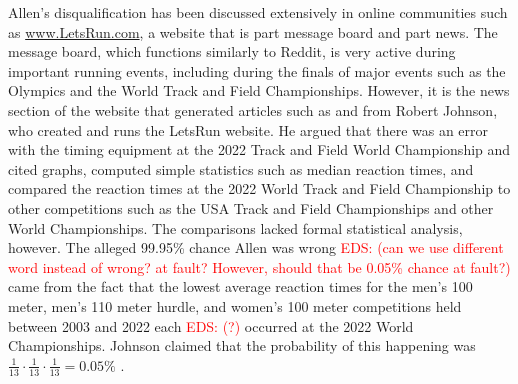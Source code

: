 \documentclass[12pt, letterpaper, titlepage]{article}
\newcommand{\eds}[1]{\textcolor{red}{EDS: (#1)}}
\newcommand{\of}[1]{\textcolor{violet}{OF: #1}}
\begin{document}

Allen's disqualification has been discussed extensively in online communities
such as \url{www.LetsRun.com}, a website that is part message board and part
news. The message board,
which functions similarly to Reddit, is very active during important running
events, including during the finals of major events such as
the Olympics and the World Track and Field Championships.  However, it is the
news section of the website that generated articles such as \citet{johnson2022data}
and \citet{johnson2022was} from  Robert Johnson, who created and runs 
the LetsRun website.  He argued that there was an error
with the timing equipment at the 2022 Track and Field World Championship and
cited graphs, computed simple statistics such as median reaction times, and 
compared the reaction times at the 2022 World Track and Field Championship to 
other competitions
such as the USA Track and Field Championships and other World Championships.
The comparisons lacked formal statistical analysis, however. 
The alleged 99.95\% chance Allen was wrong \eds{can we use different word 
instead of wrong?  at fault?  However, should that be 0.05\% chance at fault?}
came from the fact that the lowest average reaction times for the men's 100 meter,
men's 110 meter hurdle, and women's 100 meter competitions held between 2003 and 
2022 each \eds{?} occurred at the 2022 World 
Championships.  Johnson claimed that the probability of this
happening was $\frac{1}{13} \cdot \frac{1}{13} \cdot \frac{1}{13} = 0.05\%$
\citep{johnson2022was}.
\end{document}
